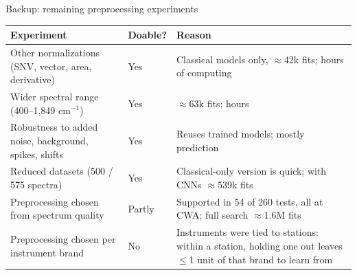 \documentclass[aspectratio=169,10pt]{beamer}
\begin{document}
\begin{frame}{Backup: remaining preprocessing experiments}
\small
\renewcommand{\arraystretch}{1.2}
\begin{tabular}{@{}p{}p{}p{}@{}}
\toprule
Experiment & Doable? & Reason\\
\midrule
Other normalizations (SNV, vector, area, derivative) & Yes & Classical models only, $\approx$42k fits; hours of computing\\
Wider spectral range (400--1,849 cm$^{-1}$) & Yes & $\approx$63k fits; hours\\
Robustness to added noise, background, spikes, shifts & Yes & Reuses trained models; mostly prediction\\
Reduced datasets (500 / 575 spectra) & Yes & Classical-only version is quick; with CNNs $\approx$539k fits\\
Preprocessing chosen from spectrum quality & Partly & Supported in 54 of 260 tests, all at CWA; full search $\approx$1.6M fits\\
Preprocessing chosen per instrument brand & No & Instruments were tied to stations: within a station, holding one out leaves $\leq$1 unit of that brand to learn from\\
\bottomrule
\end{tabular}
\end{frame}
\end{document}
